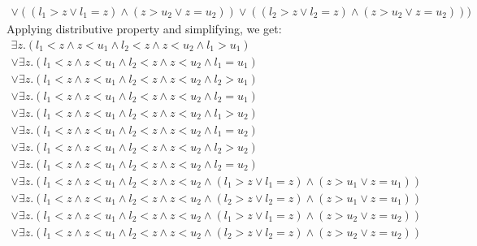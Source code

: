 \documentclass[12pt,letterpaper, onecolumn]{exam}
\begin{document}
\begin{questions}
\begin{align*}
		\lor (( l_1 > z \lor l_1 = z) \land (z > u_2 \lor z = u_2)) \lor (( l_2 > z \lor l_2 = z) \land (z > u_2 \lor z = u_2)))
	\end{align*}
	Applying distributive property and simplifying, we get:
	\begin{align*}
		\exists z. ( l_1 < z \land z < u_1 \land l_2 < z \land z < u_2 \land l_1 > u_1 ) \\
		\lor \exists z. ( l_1 < z \land z < u_1 \land l_2 < z \land z < u_2 \land l_1 = u_1 ) \\
		\lor \exists z. ( l_1 < z \land z < u_1 \land l_2 < z \land z < u_2 \land l_2 > u_1 ) \\
		\lor \exists z. ( l_1 < z \land z < u_1 \land l_2 < z \land z < u_2 \land l_2 = u_1 ) \\
		\lor \exists z. ( l_1 < z \land z < u_1 \land l_2 < z \land z < u_2 \land l_1 > u_2 ) \\
		\lor \exists z. ( l_1 < z \land z < u_1 \land l_2 < z \land z < u_2 \land l_1 = u_2 ) \\
		\lor \exists z. ( l_1 < z \land z < u_1 \land l_2 < z \land z < u_2 \land l_2 > u_2 ) \\
		\lor \exists z. ( l_1 < z \land z < u_1 \land l_2 < z \land z < u_2 \land l_2 = u_2 ) \\
		\lor \exists z. ( l_1 < z \land z < u_1 \land l_2 < z \land z < u_2 \land ( l_1 > z \lor l_1 = z) \land (z > u_1 \lor z = u_1) ) \\
		\lor \exists z. ( l_1 < z \land z < u_1 \land l_2 < z \land z < u_2 \land ( l_2 > z \lor l_2 = z) \land (z > u_1 \lor z = u_1) ) \\
		\lor \exists z. ( l_1 < z \land z < u_1 \land l_2 < z \land z < u_2 \land ( l_1 > z \lor l_1 = z) \land (z > u_2 \lor z = u_2) ) \\
		\lor \exists z. ( l_1 < z \land z < u_1 \land l_2 < z \land z < u_2 \land ( l_2 > z \lor l_2 = z) \land (z > u_2 \lor z = u_2) )
	\end{align*}


\end{questions}
\end{document}
